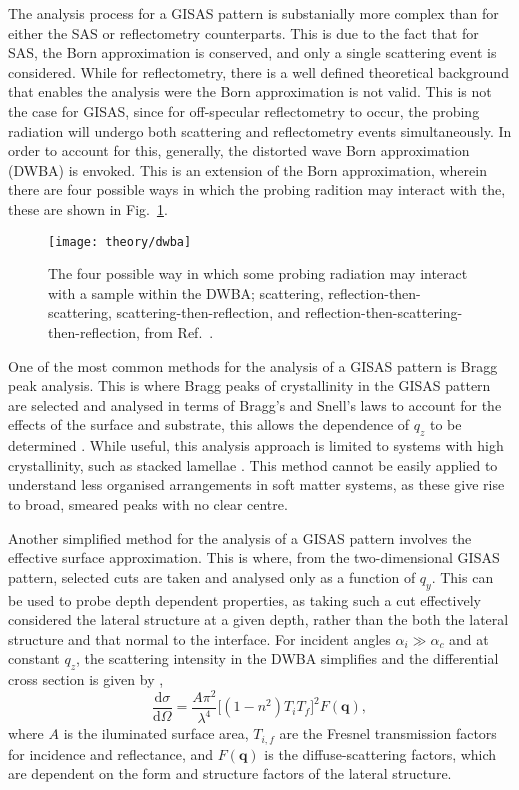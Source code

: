 The analysis process for a GISAS pattern is substanially more complex than for either the SAS or reflectometry counterparts.
This is due to the fact that for SAS, the Born approximation is conserved, and only a single scattering event is considered.
While for reflectometry, there is a well defined theoretical background that enables the analysis were the Born approximation is not valid.
This is not the case for GISAS, since for off-specular reflectometry to occur, the probing radiation will undergo both scattering and reflectometry events simultaneously.
In order to account for this, generally, the distorted wave Born approximation (DWBA) is envoked.
This is an extension of the Born approximation, wherein there are four possible ways in which the probing radition may interact with the, these are shown in Fig.~\ref{fig:dwba}.
%
\begin{figure}
	\centering
	\texttt{[image: theory/dwba]}
	\caption{The four possible way in which some probing radiation may interact with a sample within the DWBA; scattering, reflection-then-scattering, scattering-then-reflection, and reflection-then-scattering-then-reflection, from Ref.~\cite{Hexemer2015}.}
	\label{fig:dwba}
\end{figure}
%

One of the most common methods for the analysis of a GISAS pattern is Bragg peak analysis.
This is where Bragg peaks of crystallinity in the GISAS pattern are selected and analysed in terms of Bragg's and Snell's laws to account for the effects of the surface and substrate, this allows the dependence of $q_z$ to be determined \cite{Lee2007, Busch2006}.
While useful, this analysis approach is limited to systems with high crystallinity, such as stacked lamellae \cite{Busch2007}.
This method cannot be easily applied to understand less organised arrangements in soft matter systems, as these give rise to broad, smeared peaks with no clear centre.

Another simplified method for the analysis of a GISAS pattern involves the effective surface approximation.
This is where, from the two-dimensional GISAS pattern, selected cuts are taken and analysed only as a function of $q_y$.
This can be used to probe depth dependent properties, as taking such a cut effectively considered the lateral structure at a given depth, rather than the both the lateral structure and that normal to the interface.
For incident angles $\alpha_i \gg \alpha_c$ and at constant $q_z$, the scattering intensity in the DWBA simplifies and the differential cross section is given by \cite{Naudon2000},
%
\begin{equation}
	\frac{\text{d}\sigma}{\text{d}\Omega} = \frac{A\pi^2}{\lambda^4}\big[(1 - n^2)T_iT_f\big]^2F(\mathbf{q}),
\end{equation}
%
where $A$ is the iluminated surface area, $T_{i,f}$ are the Fresnel transmission factors for incidence and reflectance, and $F(\mathbf{q})$ is the diffuse-scattering factors, which are dependent on the form and structure factors of the lateral structure.

